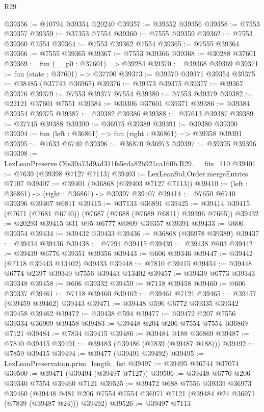 \begin{lexlean}{R29}
\begin{coremodule}
@39356 := @10794 @39354 @20240
@39357 := @39352 @39356
@39358 := @7553 @39357
@39359 := @37353 @7554
@39360 := @7555 @39359
@39362 := @7553 @39360 @7554
@39364 := @7553 @39362 @7554
@39365 := @7555 @39364
@39366 := @7555 @39365
@39367 := @7553 @39366
@39368 := @30288 @37601
@39369 := fun (__p0 : @37601) => @39284
@39370 := @39368 @39369
@39371 := fun (state : @37601) => @37700
@39373 := @39370 @39371 @39354
@39375 := @38485 (@37743 @36965)
@39376 := @39373 @39375
@39377 := @39367 @39376
@39379 := @7553 @39377 @7554
@39380 := @7553 @39379
@39382 := @22121 @37601 @7551
@39384 := @30306 @37601 @39371
@39386 := @39384 @39354 @39375
@39387 := @39382 @39386
@39388 := @37613 @39387
@39389 := @37745 @39388
@39390 := @36975 @39389
@39391 := @39380 @39390
@39394 := fun (left : @36861) => fun (right : @36861) => @39358 @39391
@39395 := @7633 @6740
@39396 := @36870 @36973
@39397 := @39395 @39396
@39398 := LexLeanPreserve.C6e39a73d9ad311fe5eda82b921ca160b.R29.__fits_110
@39401 := @7639 (@39398 @7127 @7113)
@39403 := LexLeanStd.Order.mergeEntries @7107
@39407 := @39401 (@36868 (@39403 @7127 @7113))
@39410 := (left : @36861) -> (right : @36861) -> @39397 @39407
@39414 := @7650 @6740 @39396 @39407 @6811
@39415 := @37133 @36891
@39425 := @39414 @39415 (@7671 (@7681 @6740)) (@7687 (@7688 (@7689 @6811) @39396 @7665))
@39432 := @20293 @39415 @31 @95 @6777 @6809 @39357 @39391
@39433 := @606 @39354
@39434 := @39432 @39433
@39436 := @36868 (@36978 @39389)
@39437 := @39434 @39436
@39438 := @7794 @39415
@39439 := @39438 @603
@39442 := @39439 @6776 @39351 @39356
@39443 := @606 @39346
@39447 := @39442 (@7118 @39443 @13402) @39433
@39448 := @7810 @39415
@39454 := @39448 @6774 @2397 @39349 @7556 @39443 @13402
@39457 := @39439 @6773 @39343 @39348
@39458 := @606 @39332
@39459 := @7118 @39458
@39460 := @606 @39337
@39461 := @7118 @39460
@39462 := @39461 @7121
@39465 := @39457 (@39459 @39462) @39443
@39471 := @39448 @596 @6772 @39335 @39342 @39458 @39462
@39472 := @39438 @594
@39477 := @39472 @207 @7556 @39334 @36909 @39458
@39483 := @39448 @204 @206 @7554 @7554 @36869 @7121
@39484 := @7834 @39415
@39486 := @39484 @188 @36869
@39487 := @7840 @39415
@39491 := @39483 (@39486 (@7839 (@39487 @188)))
@39492 := @7859 @39415
@39494 := @39477 (@39491 @39492)
@39495 := LexLeanPreservation.prim_length_list
@39497 := @39495 @36744 @37074
@39500 := @39471 (@39494 (@39497 @7127))
@39506 := @39448 @6770 @206 @39340 @7554 @39460 @7121
@39525 := @39472
    @688
    @7556
    @39339
    @36973
    @39460
    (@39448 @481 @206 @7554 @7554 @36971 @7121 (@39484 @24 @36971 (@7839 (@39487 @24))) @39492)
@39526 := @39497 @7113

\end{coremodule}
\end{lexlean}
